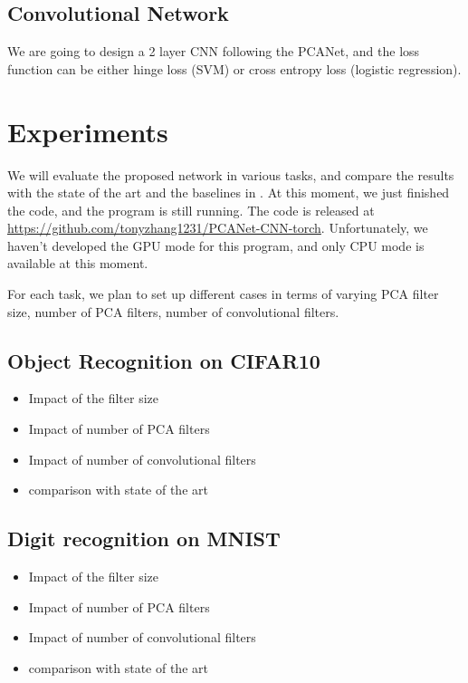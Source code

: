 \documentclass{article} %
\begin{document}
\subsection{Convolutional Network}
We are going to design a 2 layer CNN following the PCANet, and the loss function can be either hinge loss (SVM) or cross entropy loss (logistic regression).

\section{Experiments}
We will evaluate the proposed network in various tasks, and compare the results with the state of the art and the baselines in \cite{chan2015pcanet}. At this moment, we just finished the code, and the program is still running. The code is released at \href{https://github.com/tonyzhang1231/PCANet-CNN-torch}{https://github.com/tonyzhang1231/PCANet-CNN-torch}. Unfortunately, we haven't developed the GPU mode for this program, and only CPU mode is available at this moment.

For each task, we plan to set up different cases in terms of varying PCA filter size, number of PCA filters, number of convolutional filters. 

\subsection{Object Recognition on CIFAR10}
\begin{itemize}
	\item Impact of the filter size
	\item Impact of number of PCA filters
	\item Impact of number of convolutional filters
	\item comparison with state of the art
\end{itemize}

\subsection{Digit recognition on MNIST}
\begin{itemize}
	\item Impact of the filter size
	\item Impact of number of PCA filters
	\item Impact of number of convolutional filters
	\item comparison with state of the art
\end{itemize}
\end{document}
